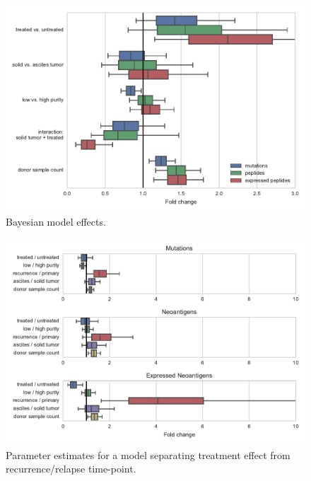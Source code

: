 \begin{figure}[htbp]
\centering
\includegraphics[scale=1.0]{figures/bayesian_model_effects.pdf}
\caption{Bayesian model effects. }
\label{fig:bayesian_model_effects}
\end{figure}

\begin{figure}[htbp]
\centering
\includegraphics[scale=1.0]{figures/bayesian_model_effects_separate.pdf}
\caption{Parameter estimates for a model separating treatment effect from recurrence/relapse time-point. }
\label{fig:bayesian_model_effects_separate}
\end{figure}


